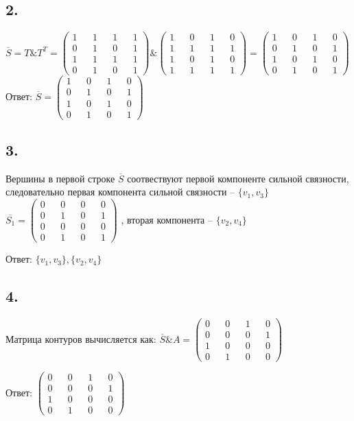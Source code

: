 \documentclass{article}
\begin{document}
\subsection*{2.}
$\overline{S} = T \& T^{T} =
\begin{pmatrix}
1 && 1 && 1 && 1 \\ 
0 && 1 && 0 && 1 \\ 
1 && 1 && 1 && 1 \\ 
0 && 1 && 0 && 1
\end{pmatrix}
\&
\begin{pmatrix}
1 && 0 && 1 && 0 \\ 
1 && 1 && 1 && 1 \\ 
1 && 0 && 1 && 0 \\ 
1 && 1 && 1 && 1
\end{pmatrix}
=
\begin{pmatrix}
1 && 0 && 1 && 0 \\
0 && 1 && 0 && 1 \\
1 && 0 && 1 && 0 \\
0 && 1 && 0 && 1
\end{pmatrix}
$
\\
Ответ:
$
\overline{S} =
\begin{pmatrix}
1 && 0 && 1 && 0 \\
0 && 1 && 0 && 1 \\
1 && 0 && 1 && 0 \\
0 && 1 && 0 && 1
\end{pmatrix}
$


\subsection*{3.}
Вершины в первой строке $\overline{S}$ соотвествуют первой компоненте сильной связности,
следовательно первая компонента сильной связности -- $\{v_1, v_3\}$ \Rightarrow
$
\overline{S_1}
=
\begin{pmatrix}
  0 && 0 && 0 && 0 \\
  0 && 1 && 0 && 1 \\
  0 && 0 && 0 && 0 \\
  0 && 1 && 0 && 1
\end{pmatrix}
$
, вторая компонента -- $\{v_2, v_4\}$

Ответ:
$
\{v_1, v_3\}, \{v_2, v_4\}
$

\subsection*{4.}
Матрица контуров вычисляется как:
$
\overline{S} \& A
=
\begin{pmatrix}
  0 && 0 && 1 && 0 \\
  0 && 0 && 0 && 1 \\
  1 && 0 && 0 && 0 \\
  0 && 1 && 0 && 0
\end{pmatrix}
$

Ответ:
$
\begin{pmatrix}
  0 && 0 && 1 && 0 \\
  0 && 0 && 0 && 1 \\
  1 && 0 && 0 && 0 \\
  0 && 1 && 0 && 0
\end{pmatrix}
$
\end{document}
